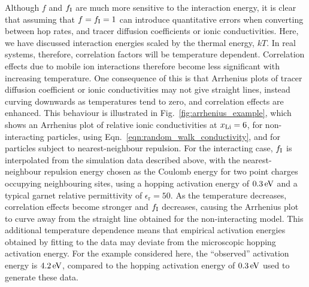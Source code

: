 \documentclass[aps,prb,twocolumn,superscriptaddress,reprint]{revtex4-1}
\newcommand{\xLi}{x_\m{Li}}
\begin{document}
Although $f$ and $f_{\mathrm{I}}$ are much more sensitive to the interaction energy, it is clear that assuming that $f=f_{\mathrm{I}}=1$ can introduce quantitative errors when converting between hop rates, and tracer diffusion coefficients or ionic conductivities. Here, we have discussed interaction energies scaled by the thermal energy, $kT$. In real systems, therefore, correlation factors will be temperature dependent. Correlation effects due to mobile ion interactions therefore become less significant with increasing temperature. One consequence of this is that Arrhenius plots of tracer diffusion coefficient or ionic conductivities may not give straight lines, instead curving downwards as temperatures tend to zero, and correlation effects are enhanced. This behaviour is illustrated in Fig.~\ref{fig:arrhenius_example}, which shows an Arrhenius plot of relative ionic conductivities at $\xLi=6$, for non-interacting particles, using Eqn.~\ref{eqn:random_walk_conductivity}, and for particles subject to nearest-neighbour repulsion. For the interacting case, $f_{\mathrm{I}}$ is interpolated from the simulation data described above, with the nearest-neighbour repulsion energy chosen as the Coulomb energy for two point charges occupying neighbouring sites, using a hopping activation energy of $0.3\,\mathrm{eV}$ and a typical garnet relative permittivity of $\epsilon_\mathrm{r}=50$.\cite{RettenwanderEtAl_InorgChem2015} As the temperature decreases, correlation effects become stronger and $f_{\mathrm{I}}$ decreases, causing the Arrhenius plot to curve away from the straight line obtained for the non-interacting model. This additional temperature dependence means that empirical activation energies obtained by fitting to the data may deviate from the microscopic hopping activation energy. For the example considered here, the ``observed'' activation energy is $4.2\,\mathrm{eV}$, compared to the hopping activation energy of $0.3\,\mathrm{eV}$ used to generate these data.
\end{document}
